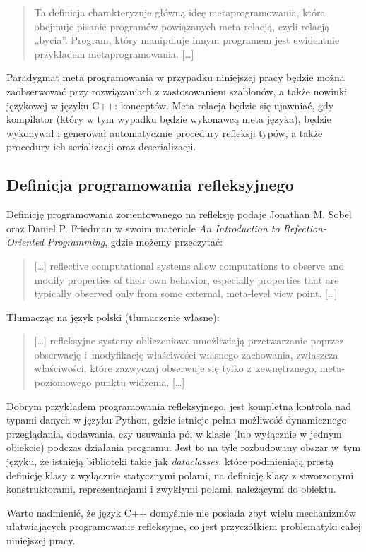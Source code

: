 \documentclass[12pt]{article}
\newcommand{\n}{\newline}
\begin{document}
{{\begin{quotation}
					Ta definicja charakteryzuje główną ideę metaprogramowania, która obejmuje pisanie
				programów powiązanych meta-relacją, czyli relacją „bycia”. Program, który
				manipuluje innym programem jest ewidentnie przykładem metaprogramowania. [\ldots]
			\end{quotation}

			Paradygmat meta programowania w przypadku niniejszej pracy będzie można zaobserwować przy
			rozwiązaniach z zastosowaniem szablonów, a także nowinki językowej w języku C++: konceptów.
			Meta-relacja będzie się ujawniać, gdy kompilator (który w tym wypadku będzie wykonawcą meta języka),
			będzie wykonywał i generował automatycznie procedury refleksji typów, a także procedury ich serializacji
			oraz deserializacji.\n
		}

		{
			\newpage
			\subsection{Definicja programowania refleksyjnego}

			Definicję programowania zorientowanego na refleksję podaje Jonathan M. Sobel oraz Daniel P. Friedman
			w swoim materiale {\it An Introduction to Refection-Oriented Programming}\cite{reflection_definition},
			gdzie możemy przeczytać:

			\begin{quotation}
				[\ldots] reflective computational systems allow computations to observe and modify properties
				of their own behavior, especially properties that are typically observed only from some
				external, meta-level view point. [\ldots]
			\end{quotation}

			{\noindent Tłumacząc na język polski (tłumaczenie własne):}

			\begin{quotation}
				[\ldots] refleksyjne systemy obliczeniowe umożliwiają przetwarzanie poprzez obserwację i~modyfikację
				właściwości własnego zachowania, zwłaszcza właściwości, które zazwyczaj obserwuje się tylko z~zewnętrznego,
				meta-poziomowego punktu widzenia. [\ldots]
			\end{quotation}

			Dobrym przykładem programowania refleksyjnego, jest kompletna kontrola nad typami danych w języku Python,
			gdzie istnieje pełna możliwość dynamicznego przeglądania, dodawania, czy usuwania pól w klasie (lub wyłącznie w jednym obiekcie)
			podczas działania programu. Jest to na tyle rozbudowany obszar w~tym języku, że istnieją biblioteki takie jak
			{\it dataclasses}\cite{python_dataclass}, które podmieniają prostą definicję klasy z wyłącznie statycznymi polami,
			na definicję klasy z stworzonymi konstruktorami, reprezentacjami i zwykłymi polami, należącymi do obiektu.

			Warto nadmienić, że język C++ domyślnie nie posiada zbyt wielu mechanizmów ułatwiających programowanie refleksyjne,
			co jest przyczółkiem problematyki całej niniejszej pracy.
		}
	}
\end{document}
